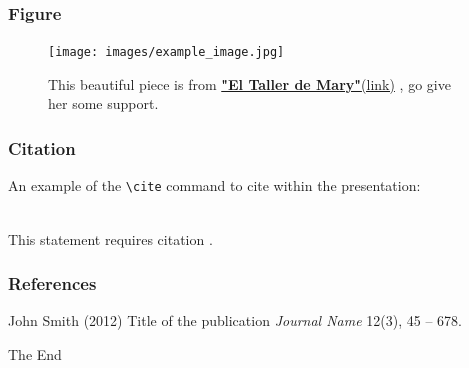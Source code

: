 \documentclass[14.5pt]{beamer}
\begin{document}

\begin{frame}
\frametitle{Figure}
\begin{figure}
\texttt{[image: images/example\_image.jpg]}
\caption{This beautiful piece is from \href{https://www.facebook.com/El-Taller-de-Mary-467073823467562}{\textbf{"El Taller de Mary"}(link)} , go give her some support.}
\end{figure}
\end{frame}


\begin{frame}[fragile] %
\frametitle{Citation}
An example of the \verb|\cite| command to cite within the presentation:\\~

This statement requires citation \cite{p1}.
\end{frame}


\begin{frame}
\frametitle{References}
\footnotesize{
\begin{thebibliography}{99} %
 John Smith (2012)
\newblock Title of the publication
\newblock \emph{Journal Name} 12(3), 45 -- 678.
\end{thebibliography}
}
\end{frame}


\begin{frame}
\Huge{\centerline{The End}}
\end{frame}

\end{document}
